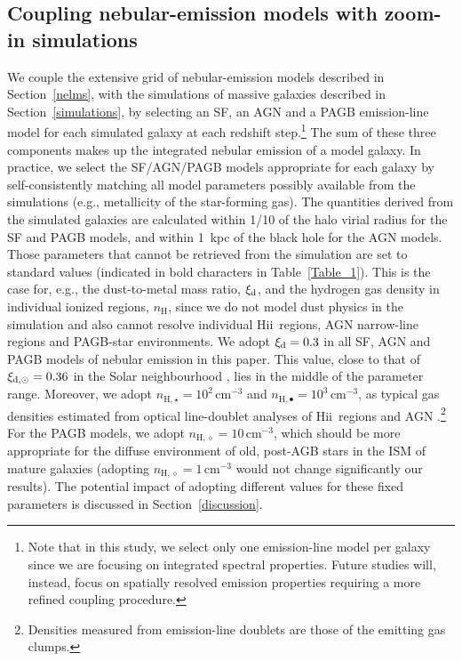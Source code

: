 \documentclass[fleqn,usenatbib]{mnras}
\newcommand{\hii}{\hbox{H{\sc ii}}}
\begin{document}
\subsection{Coupling nebular-emission models with zoom-in simulations}\label{model} 

We couple the extensive grid of nebular-emission models
described in Section~\ref{nelms}, with the simulations of massive
galaxies described in Section~\ref{simulations}, by selecting an SF, an AGN 
and a PAGB emission-line model for each simulated galaxy at each redshift
step.\footnote{Note that in this study, we select only 
one  emission-line model per galaxy since we are focusing on integrated
  spectral properties. Future studies will, instead, focus on
  spatially resolved emission properties requiring a more refined
  coupling procedure.} The sum of these three components makes
  up the integrated nebular emission of a model galaxy. 
In practice, we select the SF/AGN/PAGB models 
appropriate for each galaxy by self-consistently matching all model 
parameters possibly available from the simulations (e.g., metallicity
of the star-forming gas).  The quantities derived from the
  simulated galaxies are calculated within 1/10 of the halo virial
  radius for the SF and PAGB models, and within 1~kpc of the black hole
  for the AGN models. Those parameters that cannot be retrieved from the
simulation  are set to standard values (indicated in bold characters
in Table~\ref{Table_1}). This is the case for, e.g., the dust-to-metal
mass ratio, $\xi_{\rm d}$, and the hydrogen gas density in individual
ionized regions,  $n_{\mathrm{H}}$, since we do not
model dust physics in the simulation and also cannot resolve
individual \hii\ regions, AGN narrow-line regions and PAGB-star
environments. We adopt $\xi_{\rm d}=0.3$ in all SF, AGN and PAGB
models of nebular emission in this paper. This value, close to that of
$\xi_{\rm d,\odot}=0.36$ in the Solar  neighbourhood \citep{Gutkin16},
lies in the middle of the parameter  range. Moreover, we adopt
$n_{\mathrm{H}, \star} =10^2\,$cm$^{-3}$ and $n_{\mathrm{H},\bullet} =
10^3\,$cm$^{-3}$, as typical gas densities estimated from  
optical line-doublet analyses of \hii\ regions and AGN \citep[see,
e.g., sections 5.6 and 13.4 of][]{Osterbrock06}.\footnote{Densities
  measured from emission-line doublets are those of the emitting gas
  clumps.} For the PAGB models, we adopt $n_{\mathrm{H}, \diamond}  =
10\,$cm$^{-3}$, which should be more appropriate for the diffuse
environment of old, post-AGB stars in the ISM of mature galaxies
 (adopting $n_{\mathrm{H}, \diamond}  = 1\,$cm$^{-3}$ would not
change significantly our results). The
potential impact of adopting different values for these fixed
parameters is discussed in Section~\ref{discussion}.   
\end{document}
